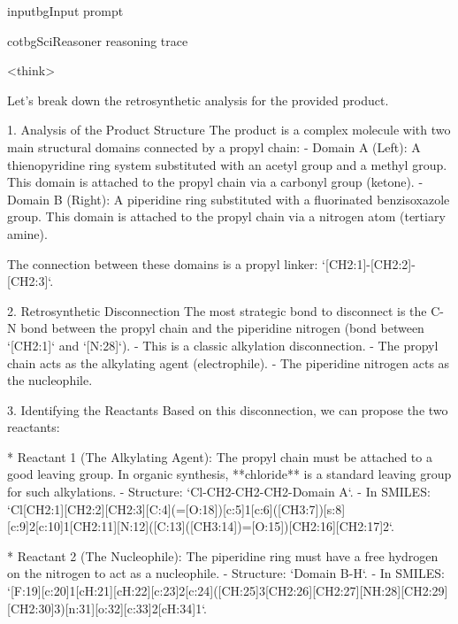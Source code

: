 \begin{appendices}
\begin{fullcotsection}{inputbg}{Input prompt}
\begin{cotverbatim}
\end{cotverbatim}

\end{fullcotsection}

\par\medskip

\begin{fullcotsection}{cotbg}{SciReasoner reasoning trace}

\begin{cotverbatim}

<think>

Let's break down the retrosynthetic analysis for the provided product.

1. Analysis of the Product Structure
The product is a complex molecule with two main structural domains connected by a propyl chain:
- Domain A (Left): A thienopyridine ring system substituted with an acetyl group and a methyl group. This domain is attached to the propyl chain via a carbonyl group (ketone).
- Domain B (Right): A piperidine ring substituted with a fluorinated benzisoxazole group. This domain is attached to the propyl chain via a nitrogen atom (tertiary amine).

The connection between these domains is a propyl linker: `[CH2:1]-[CH2:2]-[CH2:3]`.

2. Retrosynthetic Disconnection
The most strategic bond to disconnect is the C-N bond between the propyl chain and the piperidine nitrogen (bond between `[CH2:1]` and `[N:28]`).
- This is a classic alkylation disconnection.
- The propyl chain acts as the alkylating agent (electrophile).
- The piperidine nitrogen acts as the nucleophile.

3. Identifying the Reactants
Based on this disconnection, we can propose the two reactants:

*   Reactant 1 (The Alkylating Agent):
    The propyl chain must be attached to a good leaving group. In organic synthesis, **chloride** is a standard leaving group for such alkylations.
    - Structure: `Cl-CH2-CH2-CH2-Domain A`.
    - In SMILES: `Cl[CH2:1][CH2:2][CH2:3][C:4](=[O:18])[c:5]1[c:6]([CH3:7])[s:8][c:9]2[c:10]1[CH2:11][N:12]([C:13]([CH3:14])=[O:15])[CH2:16][CH2:17]2`.

*   Reactant 2 (The Nucleophile):
    The piperidine ring must have a free hydrogen on the nitrogen to act as a nucleophile.
    - Structure: `Domain B-H`.
    - In SMILES: `[F:19][c:20]1[cH:21][cH:22][c:23]2[c:24]([CH:25]3[CH2:26][CH2:27][NH:28][CH2:29][CH2:30]3)[n:31][o:32][c:33]2[cH:34]1`.


\end{cotverbatim}
\end{fullcotsection}
\end{appendices}
